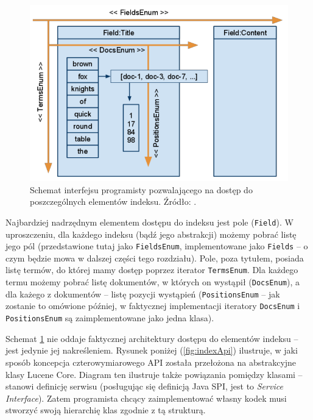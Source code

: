 \begin{figure}[here]
 \includegraphics[scale=0.5]{pictures/api.png}
 \caption{Schemat interfejsu programisty pozwalającego na dostęp do poszczególnych elementów indeksu. Źródło: \cite{flexindex}.\label{fig:4dimAPI}}
\end{figure}

Najbardziej nadrzędnym elementem dostępu do indeksu jest pole (\texttt{Field}). W uproszczeniu, dla każdego indeksu (bądź jego abstrakcji) możemy pobrać listę jego pól (przedstawione tutaj jako \texttt{FieldsEnum}, implementowane jako \texttt{Fields} -- o czym będzie mowa w dalszej części tego rozdziału). Pole, poza tytułem, posiada listę termów, do której mamy dostęp poprzez iterator \texttt{TermsEnum}. Dla każdego termu możemy pobrać listę dokumentów, w których on wystąpił (\texttt{DocsEnum}), a dla każego z dokumentów -- listę pozycji wystąpień (\texttt{PositionsEnum} -- jak zostanie to omówione później, w faktycznej implementacji iteratory \texttt{DocsEnum} i \texttt{PositionsEnum} są zaimplementowane jako jedna klasa).

Schemat \ref{fig:4dimAPI} nie oddaje faktycznej architektury dostępu do elementów indeksu -- jest jedynie jej nakreśleniem. Rysunek poniżej (\ref{fig:indexApi}) ilustruje, w jaki sposób koncepcja czterowymiarowego API została przełożona na abstrakcyjne klasy Lucene Core. Diagram ten ilustruje także powiązania pomiędzy klasami -- stanowi definicję serwisu (posługując się definicją Java SPI, jest to \emph{Service Interface}). Zatem programista chcący zaimplementować własny kodek musi stworzyć swoją hierarchię klas zgodnie z tą strukturą.

